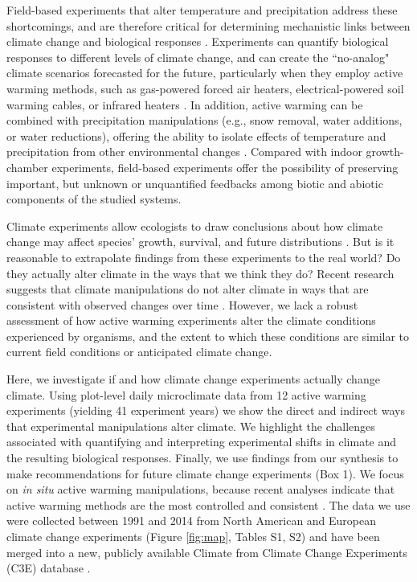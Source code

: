 \documentclass{article}
\begin{document}
\par Field-based experiments that alter temperature and precipitation address these shortcomings, and are therefore critical for determining mechanistic links between climate change and biological responses \citep[e.g.,][]{box1978,williams2007,gelman2014}. Experiments can quantify biological responses to different levels of climate change, and can create the ``no-analog" climate scenarios forecasted for the future, particularly when they employ active warming methods, such as gas-powered forced air heaters, electrical-powered soil warming cables, or infrared heaters \citep{shaver2000,williams2007b,aronson2009}. In addition, active warming can be combined with precipitation manipulations (e.g., snow removal, water additions, or water reductions), offering the ability to isolate effects of temperature and precipitation from other environmental changes \citep [e.g.,][]{price1998,cleland2006,sherry2007,rollinson2012}. %
Compared with indoor growth-chamber experiments, field-based experiments offer the possibility of preserving important, but unknown or unquantified feedbacks among biotic and abiotic components of the studied systems. 

\par Climate experiments allow ecologists to draw conclusions about how climate change may affect species' growth, survival, and future distributions \citep{dukes1999,hobbie1999,morin2010,chuine2012,reich2015,gruner2016}. But is it reasonable to extrapolate findings from these experiments to the real world? Do they actually alter climate in the ways that we think they do? Recent research suggests that climate manipulations do not alter climate in ways that are consistent with observed changes over time \citep{wolkovich2012,menke2014}. However, we lack a robust assessment of how active warming experiments alter the climate conditions experienced by organisms, and the extent to which these conditions are similar to current field conditions or anticipated climate change. 

\par Here, we investigate if and how climate change experiments actually change climate. Using plot-level daily microclimate data from 12 active warming experiments (yielding 41 experiment years) we show the direct and indirect ways that experimental manipulations alter climate. We highlight the challenges associated with quantifying and interpreting experimental shifts in climate and the resulting biological responses. Finally, we use findings from our synthesis to make recommendations for future climate change experiments (Box 1). We focus on \textit{in situ} active warming manipulations, because recent analyses indicate that active warming methods are the most controlled and consistent \citep{kimball2005,kimball2008,aronson2009,wolkovich2012}. The data we use were collected between 1991 and 2014 from North American and European climate change experiments (Figure \ref{fig:map}, Tables S1, S2) and have been merged into a new, publicly available Climate from Climate Change Experiments (C3E) database \citep{ettinger2017}. 
\end{document}
